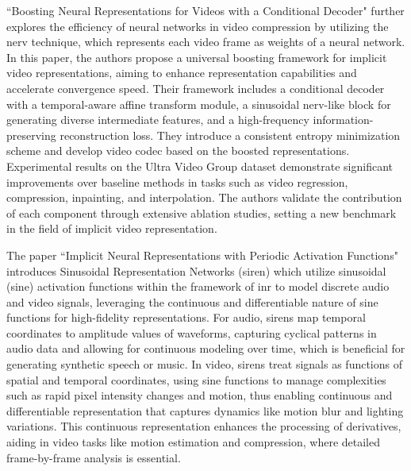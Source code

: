 ``Boosting Neural Representations for Videos with a Conditional Decoder" \cite{zhang2024boosting} further explores the efficiency of neural networks in video compression by utilizing the \gls{nerv} technique, which represents each video frame as weights of a neural network. In this paper, the authors propose a universal boosting framework for implicit video representations, aiming to enhance representation capabilities and accelerate convergence speed. Their framework includes a conditional decoder with a temporal-aware affine transform module, a sinusoidal \gls{nerv}-like block for generating diverse intermediate features, and a high-frequency information-preserving reconstruction loss. They introduce a consistent entropy minimization scheme and develop video \gls{codec} based on the boosted representations. Experimental results on the Ultra Video Group dataset demonstrate significant improvements over baseline methods in tasks such as video regression, compression, inpainting, and interpolation. The authors validate the contribution of each component through extensive ablation studies, setting a new benchmark in the field of implicit video representation.

The paper ``Implicit Neural Representations with Periodic Activation Functions" \cite{sitzmann2020implicit} introduces Sinusoidal Representation Networks (\gls{siren}) which utilize sinusoidal (sine) activation functions within the framework of \gls{inr} to model discrete audio and video signals, leveraging the continuous and differentiable nature of sine functions for high-fidelity representations. For audio, \gls{siren}s map temporal coordinates to amplitude values of waveforms, capturing cyclical patterns in audio data and allowing for continuous modeling over time, which is beneficial for generating synthetic speech or music. In video, \gls{siren}s treat signals as functions of spatial and temporal coordinates, using sine functions to manage complexities such as rapid pixel intensity changes and motion, thus enabling continuous and differentiable representation that captures dynamics like motion blur and lighting variations. This continuous representation enhances the processing of derivatives, aiding in video tasks like motion estimation and compression, where detailed frame-by-frame analysis is essential.

